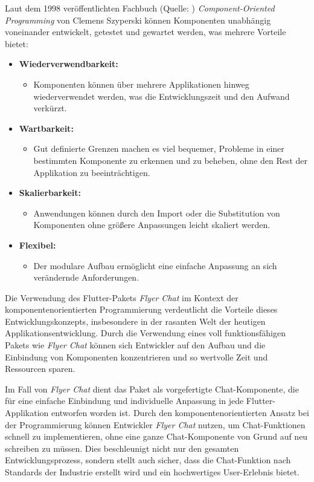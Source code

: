 Laut dem 1998 veröffentlichten Fachbuch (Quelle: \cite{szyperski-component}) \textit{Component-Oriented Programming} von Clemens Szyperski können Komponenten unabhängig voneinander entwickelt, getestet und gewartet werden, was mehrere Vorteile bietet:

\begin{itemize}
  \item \textbf{Wiederverwendbarkeit:}
        \begin{itemize}
          \item {Komponenten können über mehrere Applikationen hinweg wiederverwendet werden, was die Entwicklungszeit und den Aufwand verkürzt.}
        \end{itemize}
  \item \textbf{Wartbarkeit:}
        \begin{itemize}
          \item {Gut definierte Grenzen machen es viel bequemer, Probleme in einer bestimmten Komponente zu erkennen und zu beheben, ohne den Rest der Applikation zu beeinträchtigen.}
        \end{itemize}
  \item \textbf{Skalierbarkeit:}
        \begin{itemize}
          \item {Anwendungen können durch den Import oder die Substitution von Komponenten ohne größere Anpassungen leicht skaliert werden.}
        \end{itemize}
  \item \textbf{Flexibel:}
        \begin{itemize}
          \item {Der modulare Aufbau ermöglicht eine einfache Anpassung an sich verändernde Anforderungen.}
        \end{itemize}
\end{itemize}

Die Verwendung des Flutter-Pakets \textit{Flyer Chat} im Kontext der komponentenorientierten Programmierung verdeutlicht die Vorteile dieses Entwicklungskonzepts, insbesondere in der rasanten Welt der heutigen Applikationsentwicklung. Durch die Verwendung eines voll funktionsfähigen Pakets wie \textit{Flyer Chat} können sich Entwickler auf den Aufbau und die Einbindung von Komponenten konzentrieren und so wertvolle Zeit und Ressourcen sparen.

Im Fall von \textit{Flyer Chat} dient das Paket als vorgefertigte Chat-Komponente, die für eine einfache Einbindung und individuelle Anpassung in jede Flutter-Applikation entworfen worden ist. Durch den komponentenorientierten Ansatz bei der Programmierung können Entwickler \textit{Flyer Chat} nutzen, um Chat-Funktionen schnell zu implementieren, ohne eine ganze Chat-Komponente von Grund auf neu schreiben zu müssen. Dies beschleunigt nicht nur den gesamten Entwicklungsprozess, sondern stellt auch sicher, dass die Chat-Funktion nach Standards der Industrie erstellt wird und ein hochwertiges User-Erlebnis bietet.

